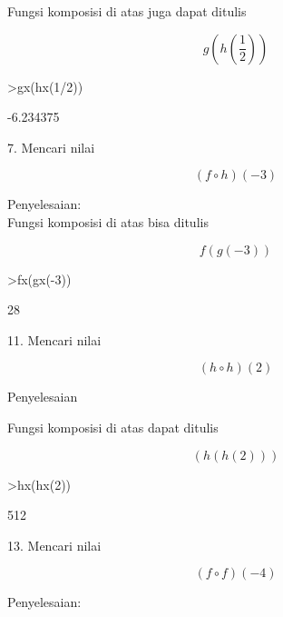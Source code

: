 \documentclass[a4paper,10pt]{article}
\begin{document}
\begin{eulernotebook}
\begin{eulercomment}
\begin{eulercomment}
\begin{eulercomment}
\begin{eulercomment}
\begin{eulercomment}
\begin{eulercomment}
\begin{eulercomment}
\begin{eulercomment}
\begin{eulercomment}
Fungsi komposisi di atas juga dapat ditulis\\
\end{eulercomment}
\begin{eulerformula}
\[
g(h(\frac{1}{2}))
\]
\end{eulerformula}
\begin{eulerprompt}
>gx(hx(1/2))
\end{eulerprompt}
\begin{euleroutput}
  -6.234375
\end{euleroutput}
\begin{eulercomment}
7. Mencari nilai\\
\end{eulercomment}
\begin{eulerformula}
\[
(f \circ h)(-3)
\]
\end{eulerformula}
\begin{eulercomment}
Penyelesaian:\\
Fungsi komposisi di atas bisa ditulis\\
\end{eulercomment}
\begin{eulerformula}
\[
f(g(-3))
\]
\end{eulerformula}
\begin{eulerprompt}
>fx(gx(-3))
\end{eulerprompt}
\begin{euleroutput}
  28
\end{euleroutput}
\begin{eulercomment}
11. Mencari nilai\\
\end{eulercomment}
\begin{eulerformula}
\[
(h \circ h)(2)
\]
\end{eulerformula}
\begin{eulercomment}
Penyelesaian

Fungsi komposisi di atas dapat ditulis\\
\end{eulercomment}
\begin{eulerformula}
\[
(h(h(2)))
\]
\end{eulerformula}
\begin{eulerprompt}
>hx(hx(2))
\end{eulerprompt}
\begin{euleroutput}
  512
\end{euleroutput}
\begin{eulercomment}
13. Mencari nilai\\
\end{eulercomment}
\begin{eulerformula}
\[
(f \circ f)(-4)
\]
\end{eulerformula}
\begin{eulercomment}
Penyelesaian:


\end{eulercomment}
\end{eulercomment}
\end{eulercomment}
\end{eulercomment}
\end{eulercomment}
\end{eulercomment}
\end{eulercomment}
\end{eulercomment}
\end{eulercomment}
\end{eulernotebook}
\end{document}
